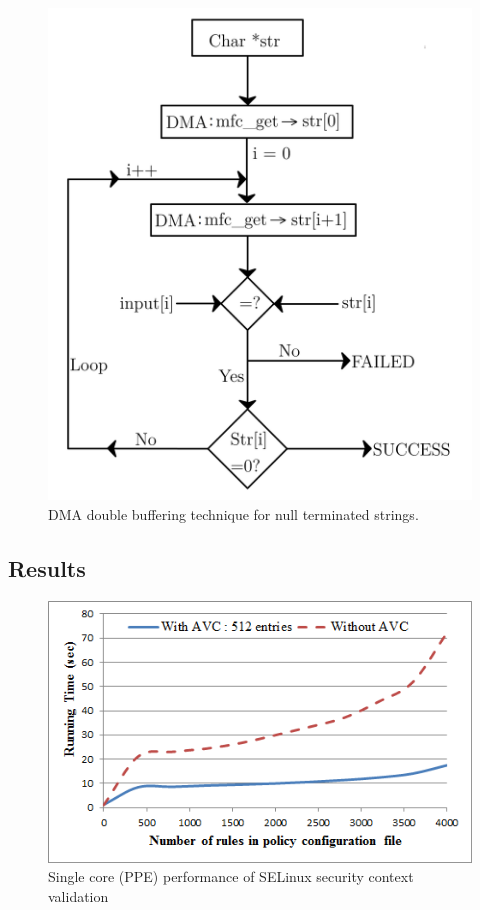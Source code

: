 \documentclass[conference]{IEEEtran}
\begin{document}
\begin{figure}
\centerline{\includegraphics[scale=0.45]{images/DMA.png}}
\caption{DMA double buffering technique for null terminated strings.}
\label{figDMA}
\vspace{-0.2cm}
\end{figure}

\subsection{Results}\label{results}

\begin{figure}
\centerline{\includegraphics[scale=0.65]{images/rules.png}}
\caption{Single core (PPE) performance of SELinux security context validation}
\label{figGraphRules}
\vspace{-0.01cm}
\end{figure}
\end{document}
